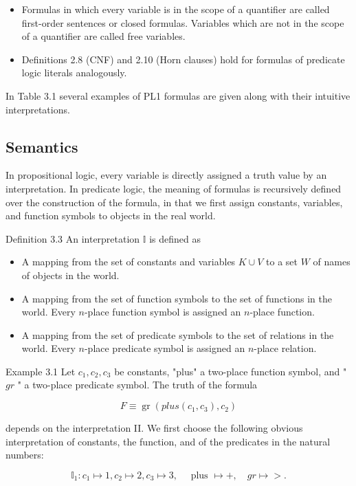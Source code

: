 \documentclass[10pt]{article}
\begin{document}
\begin{itemize}
  \item Formulas in which every variable is in the scope of a quantifier are called first-order sentences or closed formulas. Variables which are not in the scope of a quantifier are called free variables.
  \item Definitions 2.8 (CNF) and 2.10 (Horn clauses) hold for formulas of predicate logic literals analogously.
\end{itemize}

In Table 3.1 several examples of PL1 formulas are given along with their intuitive interpretations.

\subsection*{Semantics}
In propositional logic, every variable is directly assigned a truth value by an interpretation. In predicate logic, the meaning of formulas is recursively defined over the construction of the formula, in that we first assign constants, variables, and function symbols to objects in the real world.

Definition 3.3 An interpretation $\mathbb{I}$ is defined as

\begin{itemize}
  \item A mapping from the set of constants and variables $K \cup V$ to a set $W$ of names of objects in the world.
  \item A mapping from the set of function symbols to the set of functions in the world. Every $n$-place function symbol is assigned an $n$-place function.
  \item A mapping from the set of predicate symbols to the set of relations in the world. Every $n$-place predicate symbol is assigned an $n$-place relation.
\end{itemize}

Example 3.1 Let $c_{1}, c_{2}, c_{3}$ be constants, "plus" a two-place function symbol, and " $g r$ " a two-place predicate symbol. The truth of the formula

$$
F \equiv \operatorname{gr}\left(p l u s\left(c_{1}, c_{3}\right), c_{2}\right)
$$

depends on the interpretation II. We first choose the following obvious interpretation of constants, the function, and of the predicates in the natural numbers:

$$
\mathbb{I}_{1}: c_{1} \mapsto 1, c_{2} \mapsto 2, c_{3} \mapsto 3, \quad \text { plus } \mapsto+, \quad g r \mapsto>.
$$
\end{document}
